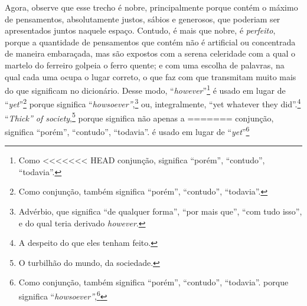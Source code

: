 {{{{{{{{{{{{{{{{{{{{{{{{{{{{{{{{{{{{{{{{{{{{{%
Agora, observe que esse trecho é nobre, principalmente porque
contém o máximo de pensamentos, absolutamente justos, sábios e
generosos, que poderiam ser apresentados juntos naquele espaço. Contudo,
é mais que nobre, é \textit{perfeito}, porque a quantidade de pensamentos
que contém não é artificial ou concentrada de maneira embaraçada, mas
são expostos com a serena celeridade com a qual o martelo do ferreiro
golpeia o ferro quente; e com uma escolha de palavras, na qual cada uma
ocupa o lugar correto, o que faz com que transmitam muito mais do que
significam no dicionário. Desse modo, ``\textit{however}''\footnote{Como
<<<<<<< HEAD
  conjunção, significa ``porém'', ``contudo'', ``todavia''.} é usado em lugar de ``\textit{yet}''\footnote{Como conjunção,
  também significa ``porém'', ``contudo'', ``todavia''.}
porque significa ``\textit{howsoever''},\footnote{Advérbio, que significa
  ``de qualquer forma'', ``por mais que'', ``com tudo isso'', e do qual
  teria derivado \textit{however}.} ou, integralmente,
``yet whatever they did''.\footnote{A despeito do que eles tenham feito.} ``\textit{Thick'' of society},\footnote{O turbilhão do
  mundo, da sociedade.} porque significa não apenas a
=======
  conjunção, significa ``porém'', ``contudo'', ``todavia''.  é usado em lugar de ``\textit{yet}''\footnote{Como conjunção,
  também significa ``porém'', ``contudo'', ``todavia''. 
porque significa ``\textit{howsoever''},\footnote{Advérbio, que significa
  ``de qualquer forma'', ``por mais que'', ``com tudo isso'', e do qual
  teria derivado \textit{however}.  ou, integralmente,
``yet whatever they did''.\footnote{A despeito do que eles tenham feito.
   ``\textit{Thick'' of society},\footnote{O turbilhão do
  mundo, da sociedade.  porque significa não apenas a
>>>>>>> 7ef31cc2a6d5603f856fee4c85bc83700040648c
multidão, mas a \textit{confusão} provocada por ela; ``\textit{ten hundred
thousand''}\footnote{Dezenas, centenas, milhares. Ruskin refere"-se ao
  uso que faz Byron das unidades do sistema decimal de numeração,
  apresentadas sem vírgulas entre elas, como recurso estilístico para
<<<<<<< HEAD
  que o leitor perceba que se trata de uma multidão de anônimos.} ao invés de ``\textit{um milhão}'' ou ``mil milhares'', para
expressar a magnitude do número, e fazer"-nos sentir que se trata de
muitos anônimos. Então vem a frase entre parênteses, ``\textit{which might
be false}'',\footnote{Que poderia ser falso.} etc.,
=======
  que o leitor perceba que se trata de uma multidão de anônimos.  ao invés de ``\textit{um milhão}'' ou ``mil milhares'', para
expressar a magnitude do número, e fazer"-nos sentir que se trata de
}}}}}}}}}}}}}}}}}}}}}}}}}}}}}}}}}}}}}}}}}}}}}}}}}
